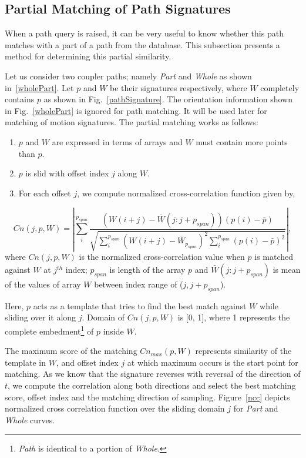 \documentclass[twocolumn,10pt]{asme2e}
\begin{document}
\subsection{Partial Matching of Path Signatures}\label{sec_ncc}
When a path query is raised, it can be very useful to know whether this path matches with a part of a path from the database.
This subsection presents a method for determining this partial similarity.

Let us consider two coupler paths; namely \emph{Part} and \emph{Whole} as shown in~\ref{wholePart}.
Let $p$ and $W$ be their signatures respectively, where $W$ completely contains $p$ as shown in Fig.~\ref{pathSignature}.
The orientation information shown in Fig.~\ref{wholePart} is ignored for path matching. It will be used later for matching of motion signatures.
The partial matching works as follows:

\begin{enumerate}
  \item $p$ and $W$ are expressed in terms of arrays and $W$ must contain more points than $p$.
  \item $p$ is slid with offset index $j$ along $W$.
  \item For each offset $j$, we compute normalized cross-correlation\cite{lewis1995fast} function given by,
\end{enumerate}
\vspace{-0.6cm}
\begin{equation}\label{nccEq}
  Cn(j, p, W) = |\sum_{i}^{p_{span}} \frac{(W(i+j) - \bar{W}(j : j + p_{span}))(p(i) - \bar{p})}{\sqrt{\sum_{i}^{p_{span}}{(W(i+j) - \bar{W}_{p_{span}})}^2\sum_{i}^{p_{span}}{(p(i) - \bar{p})}^2}} |,
\end{equation}
where $Cn(j, p, W)$ is the normalized cross-correlation value when $p$ is matched against $W$ at $j^{th}$ index; $p_{span}$ is length of the array $p$ and $\bar{W}(j:j + p_{span})$ is mean of the values of array $W$ between index range of ($j, j+p_{span}$).

Here, $p$ acts as a template that tries to find the best match against $W$ while sliding over it along $j$.
Domain of $Cn(j, p, W)$ is [0, 1], where 1 represents the complete embedment\footnote{\emph{Path} is identical to a portion of \emph{Whole}.} of $p$ inside $W$.

The maximum score of the matching $Cn_{max}(p, W)$ represents similarity of the template in $W$, and offset index $j$ at which maximum occurs is the start point for matching.
As we know that the signature reverses with reversal of the direction of $t$, we compute the correlation along both directions and select the best matching score, offset index and the matching direction of sampling.
Figure~\ref{ncc} depicts normalized cross correlation function over the sliding domain $j$ for \emph{Part} and \emph{Whole} curves.
\end{document}
